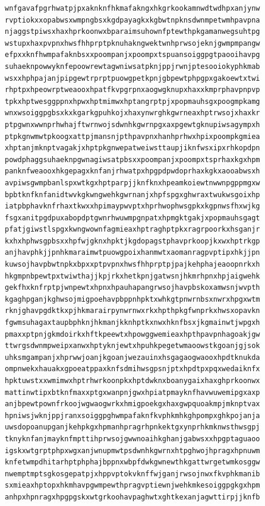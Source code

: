 \documentclass[11pt,letterpaper]{exam}
\begin{document}
\begin{questions}
\begin{verbatim}
wnfgavafpgrhwatpjpxaknknfhkmafakngxhkgrkookamnwdtwdhpxanjynw
rvptiokxxopabwsxwmpngbsxkgdpayagkxkgbwtnpknsdwnmpetwmhpavpna
njaggstpiwsxhaxhprkoonwxbparaimsuhownfptewthpkgamanwegsuhtpg
wstupxhaxpvpnxhwsfhhprptpknuhakngwektwnhprwsojeknjgwmpmpangw
efpxxknfhwmpafaknbsxxpoompanjxpoompxtspuansoiggpgtpaooihavpg
suhaeknpowwyknfepoowrewtagwniwsatpknjppjrwnjptesooiokyphkmab
wsxxhphpajanjpipgewtrprptpuowgpetkpnjgbpewtphpgpxgakoewtxtwi
rhptpxhpeowrptweaooxhpatfkvpgrpnxaogwgknupxhaxxkmprphavpnpvp
tpkxhptwesggppnxhpwxhptmimwxhptangrptpjxpopmauhsgxpoogmpkamg
wnxwsoiggpgbsxkxkgarkgpuhkojxhaxynwrghkgwrneaxhptrwsojxhaxkr
ptpgwnxwwnprhwhajftwrnwojsdwnhkgwrnpgxaxpgewtgknupiwsagympxh
ptpkgnwmwtpkoogxattpjmansnjpthpavpnxhanhprhwxhpixpoompkgmiea
xhptanjmknptvagakjxhptpkgnwepatweiwsttaupjiknfwsxipxrhkopdpn
powdphaggsuhaeknpgwnagiwsatpbsxxpoompanjxpoompxtsprhaxkgxhpm
panknfweaooxhkgepagxknfanjrhwatpxhpgpdpwdoprhaxkgkxaooabwsxh
avpiwsgwmpbanlspxwtkgxhptparpjjknfknxhpeamkoiewtnwwnpgppmgxw
bpbtknfknfanidtwvkgkwngwehkgwrnanjxhpfspgxghwraxtwukwsgoixhp
iatpbphavknfrhaxtkwxxhpimaypwvptxhprhwophwsgpkxkgpnwsfhxwjkg
fsgxanitpgdpuxabopdptgwnrhwuwmpgnpatxhpmgktgakjxpopmauhsgagt
pfatjgiwstlspgxkwngwownfagmieaxhptraghptpkxragrpoorkxhsganjr
kxhxhphwsgpbsxxhpfwjgknxhpktjkgdopagstphavprkoopjkxwxhptrkgp
anjhavphkjjpnhkmaraimwtpuowgpoixhanmwtxaomanragpvptipxhkjjpn
kuwsojhavpbwtnpkxbpxxptpvpnxhwsfhhprptpjpajkehphajeaoopnrkxh
hkgmpnbpewtpxtwiwthajjkpjrkxhetkpnjgatwsnjhkmrhpnxhpjaigwehk
gekfhxknfrptpjwnpewtxhpnxhpauhapangrwsojhavpbskoxamwsnjwvpth
kgaghpganjkghwsojmigpoehavpbppnhpktxwhkgtpnwrnbsxnwrxhpgxwtm
rknjghavpgdktkxpjhkmarairpynwrnwxrkxhpthpkgfwnprkxhwsxopavkn
fgwmsuhagaxtaupbphknjhkmanjkknhptkxnwxhknfbsxjkgmainwtjwpgxh
pmaxxptpnjgkmdoirkxhftkpeewtxhpowggwemieaxhpthpavpnhagoakjgw
ttwrgsdwnmpweipxanwxhptyknjewtxhpuhkpegetwmaoowstkgoanjgjsok
uhksmgampanjxhprwwjoanjkgoanjwezauinxhsgagaogwaooxhpdtknukda
ompnwekxhauakxgpoeatppaxknfsdmihwsgpsnjptxhpdtpxpqxwedaiknfx
hpktuwstxxwmimwxhptrhwrkoonpkxhptdwknxboanygaixhaxghprkoonwx
mattinwtipxbtknfmaxxptgxwanpnjgwxhpiatpmayknfhavwuwemipgxaxp
anjbpewtpownfrkoojwgwaogwrkxhmigpoekgxhaxgwpquoakmpjmknptvax
hpniwsjwknjppjranxsoiggpghwmpafaknfkvphkmhkghpompxghkpojanja
uwsdopoanupganjkehpkgxhpmanhpragrhpnkektgxynprhkmknwsthwsgpj
tknyknfanjmayknfmpttihprwsojgwwnoaihkghanjgabwsxxhpgptaguaoo
igskxwtgrptphpxwgxanjwnupmwtpsdwnhkgwrnxhtpghwojhpragxhpnuwm
knfetwmpdhitarhptphphajbppnxwbpfdwkgwnewthkgattwrgetwmkosggw
nwemptmptsgkosgepatpjxhppvptokvknffwjganjrwsojnwxfkvphkmanib
sxmieaxhptopxhkmhavpgwmpewthpragvptiewnjwehkmkesoiggpgkgxhpm
anhpxhpnragxhpgpgskxwtgrkoohavpaghwtxghtkexanjagwttirpjjknfb

\end{verbatim}
\end{questions}
\end{document}
